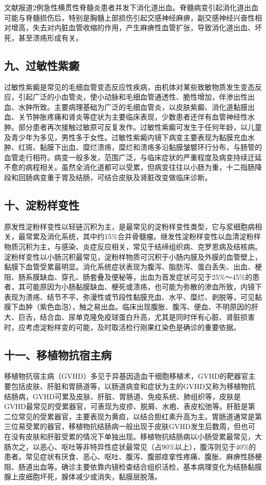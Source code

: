 文献报道2例急性横贯性脊髓炎患者并发下消化道出血。脊髓病变引起消化道出血可能与脊髓损伤后，特别是胸髓上部损伤引起交感神经麻痹，副交感神经兴奋性相对增高，失去对内脏血管收缩的作用，产生麻痹性血管扩张，导致消化道出血、坏死，甚至溃疡形成有关。

\subsection{九、过敏性紫癜}

过敏性紫癜是常见的毛细血管变态反应性疾病，由机体对某些致敏物质发生变态反应，引起广泛的小血管炎，使小动脉和毛细血管通透性、脆性增加，伴渗出性出血、水肿所致。主要病理基础为广泛的毛细血管炎，以皮肤紫癜、消化道黏膜出血、关节肿胀疼痛和肾炎等症状为主要临床表现，少数患者还伴有血管神经性水肿。部分患者再次接触过敏原可反复发作。过敏性紫癜可发生于任何年龄，以儿童及青少年为多见，男性多于女性。过敏性紫癜内镜下病变主要表现为黏膜充血水肿、红斑、黏膜下出血、糜烂溃疡，糜烂和溃疡多沿黏膜皱襞环行分布，与肠管的血管走行相符。病变一般多发，范围广泛，与临床症状的严重程度及病变持续迁延不愈的病程相关。虽然全消化道都可以受累，但病变往往以小肠为重，十二指肠降段和回肠病变重于胃及结肠，可结合皮肤及肾脏改变做临床诊断。

\subsection{十、淀粉样变性}

原发性淀粉样变性以轻链沉积为主，是最常见的淀粉样变性类型，它与浆细胞病相关，最常累及消化系统，其中约15\%合并骨髓瘤。继发性淀粉样变性以血清淀粉样物质沉积为主，与感染、炎症反应相关，常见于结缔组织病、克罗恩病及结核病。淀粉样变性以小肠沉积最常见，淀粉样物质可沉积于小肠内膜及外膜的血管壁上，黏膜下血管受累最明显。消化系统症状表现为腹泻、脂肪泻、蛋白丢失、出血、梗阻、肠系膜缺血、穿孔、肠套叠及便秘等，出血为首发症状可见于25\%～45\%的患者，其可能原因为小肠黏膜缺血、梗死或溃疡，也可能为弥散的渗血所致，内镜下表现为溃疡、结节不平、弥漫性或节段性黏膜充血、水平、糜烂、剥脱等，可见黏膜下血肿（紫色血泡），触之易出血。临床出现腹胀、腹泻、便血、不明原因的肝大、巨舌，结合血、尿单克隆免疫球蛋白升高，尤其是同时伴有心脏、肾脏损害时，应考虑淀粉样变的可能，及时取活检行刚果红染色是确诊的重要依据。

\subsection{十一、移植物抗宿主病}

移植物抗宿主病（GVHD）多见于异基因造血干细胞移植术，GVHD的靶器官主要包括皮肤、肝脏和胃肠道等，以肠道病变和症状为主的GVHD又称为移植物抗结肠病，GVHD可累及皮肤、肝脏、胃肠道、免疫系统、肺组织等，皮肤是GVHD最常见的受累器官，可表现为皮疹、脱屑、水疱、表皮松弛等。肝脏是第二位常见的受累器官，主要表现为黄疸，以结合胆红素升高为主。胃肠道通常是第三位易受累的器官，移植物抗结肠病一般出现于皮肤GVHD发生后数周，但也可在没有皮肤和肝脏受累的情况下单独出现。移植物抗结肠病以小肠受累最常见，大肠次之，以恶心、呕吐等非特异性症状最常见（占90\%以上），腹泻则见于40\%的患者。常见症状有厌食、恶心、呕吐、腹泻、腹部痉挛性疼痛、腹胀、麻痹性肠梗阻、肠道出血等。确诊主要依靠内镜检查结合组织活检，基本病理变化为结肠黏膜腺上皮细胞坏死，腺体减少或消失，黏膜层脱落。

